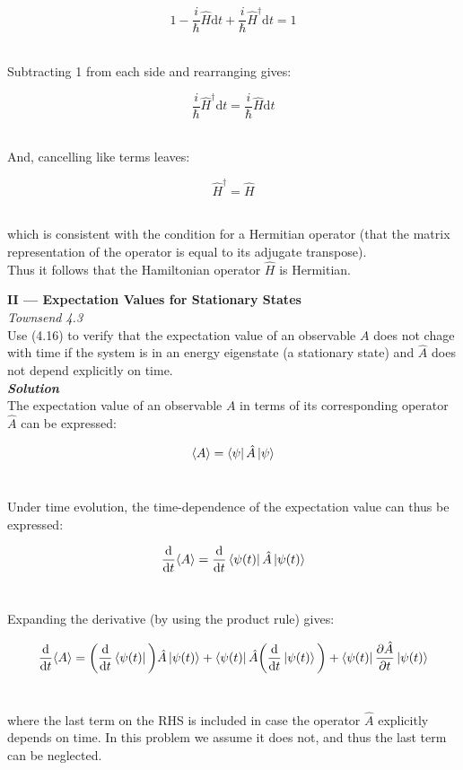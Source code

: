 \documentclass[9pt]{extarticle}
\newcommand{\bfit}[1]{\textbf{\textit{#1}}}
\renewcommand{\d}{\text{d}}
\newcommand{\ddt}[1]{\frac{\d #1}{\d t}}
\newcommand{\pd}[2]{\frac{\partial #1}{\partial #2}}
\begin{document}
\begin{multicols*}{2}
$$1 - \frac i \hbar \hat H \d t + \frac i \hbar \hat H^\dagger \d t = 1$$ \ 

Subtracting 1 from each side and rearranging gives:

$$\frac i \hbar \hat H^\dagger \d t = \frac i \hbar \hat H \d t$$ \ 

And, cancelling like terms leaves:

$$\hat H^\dagger = \hat H$$ \ 

which is consistent with the condition for a Hermitian operator (that the matrix representation of the operator is equal to its adjugate transpose). \\ 

Thus it follows that the Hamiltonian operator $\hat H$ is Hermitian. \\ 





\hrulefill 

\hfill 

{\bf \LARGE II --- Expectation Values for Stationary States} \\ 

{\it Townsend 4.3} \\ 
Use (4.16) to verify that the expectation value of an observable $A$ does not chage with time if the system is in an energy eigenstate (a stationary state) and $\hat A$ does not depend explicitly on time. \\ 

{\bfit{Solution}} \\ 
The expectation value of an observable $A$ in terms of its corresponding operator $\hat A$ can be expressed:

$$\langle A \rangle = \bra{\psi} \hat A \ket{\psi}$$ \ 

Under time evolution, the time-dependence of the expectation value can thus be expressed:

$$\ddt{} \langle A \rangle = \ddt{} \bra{\psi(t)} \hat A \ket{\psi(t)}$$ \ 

Expanding the derivative (by using the product rule) gives:

$$\ddt{} \langle A \rangle = \bigg( \ddt{} \bra{\psi(t)} \bigg) \hat A \ket{\psi(t)} + \bra{\psi(t)} \hat A \bigg( \ddt{} \ket{\psi(t)} \bigg) + \bra{\psi(t)} \pd{\hat A}{t} \ket{\psi(t)}$$ \ 

where the last term on the RHS is included in case the operator $\hat A$ explicitly depends on time. In this problem we assume it does not, and thus the last term can be neglected. \\ 


\end{multicols*}
\end{document}
